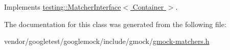 Implements \hyperlink{classtesting_1_1_matcher_interface_a296b43607cd99d60365f0e6a762777cf}{testing\+::\+Matcher\+Interface$<$ Container $>$}.



The documentation for this class was generated from the following file\+:\begin{DoxyCompactItemize}
\item 
vendor/googletest/googlemock/include/gmock/\hyperlink{gmock-matchers_8h}{gmock-\/matchers.\+h}\end{DoxyCompactItemize}

